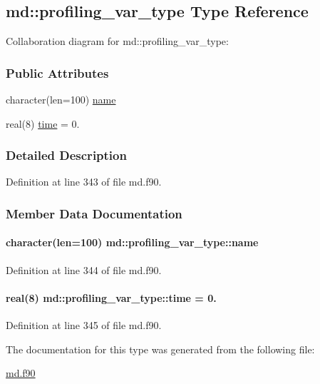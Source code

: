 \hypertarget{structmd_1_1profiling__var__type}{\subsection{md\-:\-:profiling\-\_\-var\-\_\-type Type Reference}
\label{structmd_1_1profiling__var__type}
}


Collaboration diagram for md\-:\-:profiling\-\_\-var\-\_\-type\-:
\subsubsection*{Public Attributes}
\begin{DoxyCompactItemize}
\item 
character(len=100) \hyperlink{structmd_1_1profiling__var__type_adc4fac62ad96bd6f5a3490b0b55fb4ce}{name}
\item 
real(8) \hyperlink{structmd_1_1profiling__var__type_a9ea740050b97be7fedda045cca18375e}{time} = 0.
\end{DoxyCompactItemize}


\subsubsection{Detailed Description}


Definition at line 343 of file md.\-f90.



\subsubsection{Member Data Documentation}
\hypertarget{structmd_1_1profiling__var__type_adc4fac62ad96bd6f5a3490b0b55fb4ce}{
\paragraph[{name}]{\setlength{\rightskip}{0pt plus 5cm}character(len=100) md\-::profiling\-\_\-var\-\_\-type\-::name}}\label{structmd_1_1profiling__var__type_adc4fac62ad96bd6f5a3490b0b55fb4ce}


Definition at line 344 of file md.\-f90.

\hypertarget{structmd_1_1profiling__var__type_a9ea740050b97be7fedda045cca18375e}{
\paragraph[{time}]{\setlength{\rightskip}{0pt plus 5cm}real(8) md\-::profiling\-\_\-var\-\_\-type\-::time = 0.}}\label{structmd_1_1profiling__var__type_a9ea740050b97be7fedda045cca18375e}


Definition at line 345 of file md.\-f90.



The documentation for this type was generated from the following file\-:\begin{DoxyCompactItemize}
\item 
\hyperlink{md_8f90}{md.\-f90}\end{DoxyCompactItemize}
